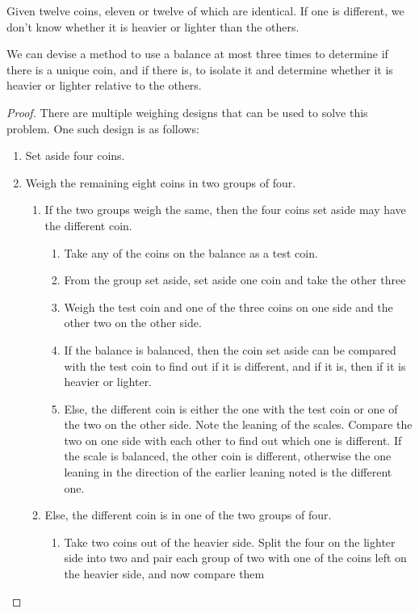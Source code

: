 \documentclass[name=Mehul\ Arora, andrewid=mehul21066, course=CSE121, num=1]{homework}
\begin{document}
    
Given twelve coins, eleven or twelve of which are identical. If one is different, we don't know whether it is heavier or lighter than the others. 

\begin{claim}
    We can devise a method to use a balance at most three times to determine if there is a unique coin, and if there is, to isolate it and determine whether it is heavier or lighter relative to the others.
\end{claim}
\begin{proof}
    There are multiple weighing designs that can be used to solve this problem. One such design is as follows:
    \begin{enumerate}
        \item Set aside four coins.
        \item Weigh the remaining eight coins in two groups of four. 
        \begin{enumerate}
            \item If the two groups weigh the same, then the four coins set aside may have the different coin.
            \begin{enumerate}
                \item Take any of the coins on the balance as a test coin.
                \item From the group set aside, set aside one coin and take the other three
                \item Weigh the test coin and one of the three coins on one side and the other two on the other side.
                \item If the balance is balanced, then the coin set aside can be compared with the test coin to find out if it is different, and if it is, then if it is heavier or lighter.
                \item Else, the different coin is either the one with the test coin or one of the two on the other side. Note the leaning of the scales. Compare the two on one side with each other to find out which one is different. If the scale is balanced, the other coin is different, otherwise the one leaning in the direction of the earlier leaning noted is the different one.
            \end{enumerate}
            \item Else, the different coin is in one of the two groups of four.
            \begin{enumerate}
                \item Take two coins out of the heavier side. Split the four on the lighter side into two and pair each group of two with one of the coins left on the heavier side, and now compare them

\end{enumerate}
\end{enumerate}
\end{enumerate}
\end{proof}
\end{document}

